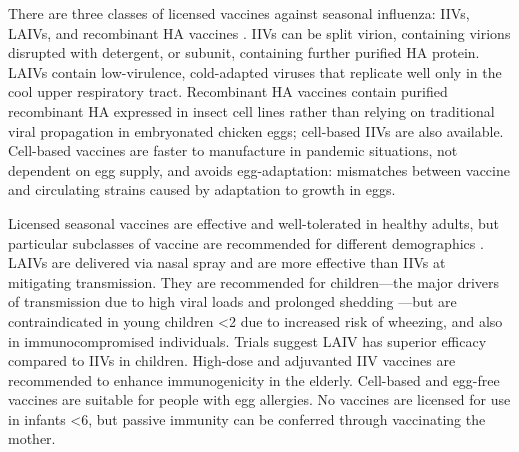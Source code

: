 There are three classes of licensed vaccines against seasonal influenza: \glspl{IIV}, \glspl{LAIV}, and recombinant \gls{HA} vaccines \autocite{houser2015InfluenzaVaccinesChallenges,krammer2019HumanAntibodyResponse}.
\Glspl{IIV} can be split virion, containing virions disrupted with detergent, or subunit, containing further purified \gls{HA} protein.
\Glspl{LAIV} contain low-virulence, cold-adapted viruses that replicate well only in the cool upper respiratory tract.
Recombinant \gls{HA} vaccines contain purified recombinant \gls{HA} expressed in insect cell lines rather than relying on traditional viral propagation in embryonated chicken eggs; cell-based \glspl{IIV} are also available. 
Cell-based vaccines are faster to manufacture in pandemic situations, not dependent on egg supply, and avoids egg-adaptation: mismatches between vaccine and circulating strains caused by adaptation to growth in eggs.

Licensed seasonal vaccines are effective and well-tolerated in healthy adults, but particular subclasses of vaccine are recommended for different demographics \autocite{bresee2018InactivatedInfluenzaVaccines,luke2018InfluenzaVaccineLive,poland2018PersonalizedVaccinologyReview,ramsay2020InfluenzaGreenBook}.
\glspl{LAIV} are delivered via nasal spray and are more effective than \glspl{IIV} at mitigating transmission. 
They are recommended for children---the major drivers of transmission due to high viral loads and prolonged shedding \autocite{krammer2018Influenza,bresee2018InactivatedInfluenzaVaccines}---but are contraindicated in young children \SI{<2}{\year} due to increased risk of wheezing, and also in immunocompromised individuals.
Trials suggest \gls{LAIV} has superior efficacy compared to \glspl{IIV} in children.
High-dose and adjuvanted \gls{IIV} vaccines are recommended to enhance immunogenicity in the elderly.
Cell-based and egg-free vaccines are suitable for people with egg allergies.
No vaccines are licensed for use in infants \SI{<6}{\month}, but passive immunity can be conferred through vaccinating the mother.

